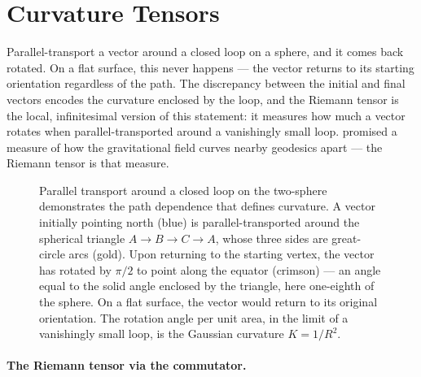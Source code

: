 \section{Curvature Tensors}
\label{sec:dg-curvature}

Parallel-transport a vector around a closed loop on a sphere, and it comes
back rotated.  On a flat surface, this never happens --- the vector returns to
its starting orientation regardless of the path.  The discrepancy between the
initial and final vectors encodes the curvature enclosed by the loop, and the
Riemann tensor is the local, infinitesimal version of this statement: it
measures how much a vector rotates when parallel-transported around a
vanishingly small loop.   promised a measure of how the
gravitational field curves nearby geodesics apart --- the Riemann tensor is
that measure.

\begin{figure}[htbp]
  \centering
  
  \caption[Parallel transport around a closed loop on the two-sphere]{Parallel transport around a closed loop on the two-sphere
    demonstrates the path dependence that defines curvature.  A vector
    initially pointing north (blue) is parallel-transported around the
    spherical triangle $A \to B \to C \to A$, whose three sides are
    great-circle arcs (gold).  Upon returning to the starting vertex, the
    vector has rotated by $\pi/2$ to point along the equator (crimson) ---
    an angle equal to the solid angle enclosed by the triangle, here
    one-eighth of the sphere.  On a flat surface, the vector would return
    to its original orientation.  The rotation angle per unit area, in the
    limit of a vanishingly small loop, is the Gaussian curvature
    $K = 1/R^2$.}
  \label{fig:parallel-transport-loop}
\end{figure}

\paragraph{The Riemann tensor via the commutator.}

